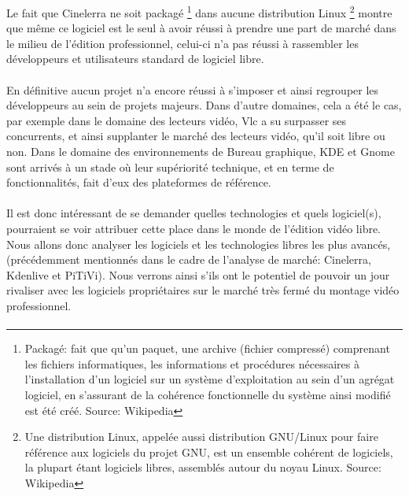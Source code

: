 
Le fait que Cinelerra ne soit packagé \footnote{Packagé: fait
que qu'un paquet, une archive (fichier compressé) comprenant les
fichiers informatiques, les informations et procédures nécessaires
à l'installation d'un logiciel sur un système d'exploitation au sein
d'un agrégat logiciel, en s'assurant de la cohérence fonctionnelle
du système ainsi modifié est été créé. Source: Wikipedia} dans
aucune distribution Linux \footnote {Une distribution Linux, appelée
aussi distribution GNU/Linux pour faire référence aux logiciels du
projet GNU, est un ensemble cohérent de logiciels, la plupart étant
logiciels libres, assemblés autour du noyau Linux. Source: Wikipedia}
montre que même ce logiciel est le seul à avoir réussi à prendre une
part de marché dans le milieu de l'édition professionnel, celui-ci n'a
pas réussi à rassembler les développeurs et utilisateurs standard de
logiciel libre.

\paragraph{}

En définitive aucun projet n'a encore réussi à s'imposer et ainsi
regrouper les développeurs au sein de projets majeurs. Dans d'autre
domaines, cela a été le cas, par exemple dans le domaine des lecteurs
vidéo, Vlc a su surpasser ses concurrents, et ainsi supplanter le
marché des lecteurs vidéo, qu'il soit libre ou non. Dans le domaine
des environnements de Bureau graphique, KDE et Gnome sont arrivés à un
stade où leur supériorité technique, et en terme de fonctionnalités,
fait d'eux des plateformes de référence.

\paragraph{}

Il est donc intéressant de se demander quelles technologies et quels
logiciel(s), pourraient se voir attribuer cette place dans le monde
de l'édition vidéo libre. Nous allons donc analyser les logiciels et
les technologies libres les plus avancés, (précédemment mentionnés
dans le cadre de l'analyse de marché: Cinelerra, Kdenlive et PiTiVi).
Nous verrons ainsi s'ils ont le potentiel de pouvoir un jour rivaliser
avec les logiciels propriétaires sur le marché très fermé du montage
vidéo professionnel.

\paragraph{}

